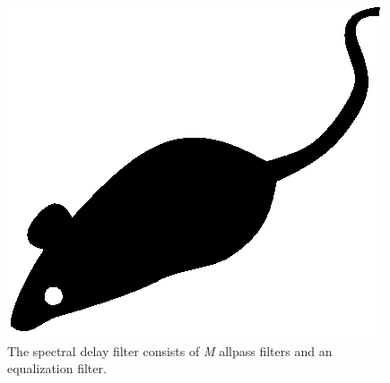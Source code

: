 \documentclass{aes2e}
\begin{document}
\begin{figure}
\centering
\includegraphics{aes2e-mouse.eps}
\caption{The spectral delay filter consists of \textit{M} allpass filters and an equalization filter.}
\end{figure}
\end{document}
